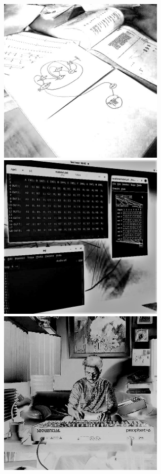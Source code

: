 \documentclass[12pt,landscape]{article}
\begin{document}
{\begin{center}
\begin{figure}[!htb]
\endminipage\hfill
{}
  \includegraphics[width=8cm]{sketch.jpg}

\endminipage\hfill
{}%
  \includegraphics[width=8cm]{pd.jpg}

\endminipage\hfill
{}%
  \includegraphics[width=8cm]{proph.jpg}


\end{figure}
\end{center}}
\end{document}
